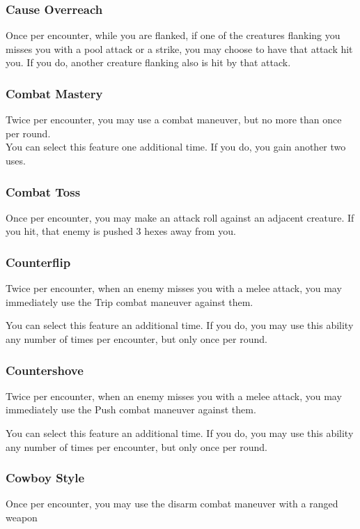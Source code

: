 \begin{multicols*}{2}
\subsubsection{Cause Overreach}
Once per encounter, while you are flanked, if one of the creatures flanking you misses you with a pool attack or a strike, you may choose to have that attack hit you. If you do, another creature flanking also is hit by that attack.

\subsubsection{Combat Mastery}
Twice per encounter, you may use a combat maneuver, but no more than once per round.\\
You can select this feature one additional time. If you do, you gain another two uses.

\subsubsection{Combat Toss}
Once per encounter, you may make an attack roll against an adjacent creature. If you hit, that enemy is pushed 3 hexes away from you.

\subsubsection{Counterflip}
Twice per encounter, when an enemy misses you with a melee attack, you may immediately use the Trip combat maneuver against them.

You can select this feature an additional time. If you do, you may use this ability any number of times per encounter, but only once per round.

\subsubsection{Countershove}
Twice per encounter, when an enemy misses you with a melee attack, you may immediately use the Push combat maneuver against them.

You can select this feature an additional time. If you do, you may use this ability any number of times per encounter, but only once per round.

\subsubsection{Cowboy Style}
Once per encounter, you may use the disarm combat maneuver with a ranged weapon


\end{multicols*}

